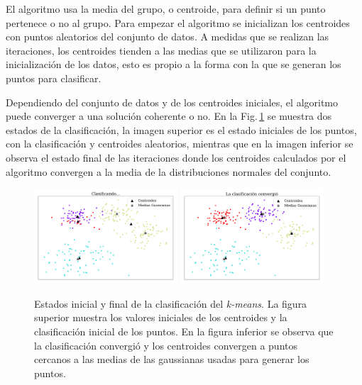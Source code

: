     El algoritmo usa la media del grupo, o centroide, para definir si un punto pertenece o no al grupo. Para empezar el algoritmo se inicializan los centroides con puntos aleatorios del conjunto de datos.  A medidas que se realizan las iteraciones, los centroides tienden a las medias que se utilizaron para la inicialización de los datos, esto es propio a la forma con la que se generan los puntos para clasificar.

    Dependiendo del conjunto de datos y de los centroides iniciales, el algoritmo puede converger a una solución coherente o no. En  la Fig.\,\ref{fig:ejer2_converge} se muestra dos estados de la clasificación, la imagen superior es el estado iniciales de los puntos, con la clasificación y centroides aleatorios, mientras que en la imagen inferior se observa el estado final de las iteraciones donde los centroides calculados por el algoritmo convergen a la media de la distribuciones normales del conjunto.

    \begin{figure}[H]
        \centering
        \includegraphics[width=0.475\textwidth]{plots/ejer_2_clasificando_a_conv.pdf}
        \includegraphics[width=0.475\textwidth]{plots/ejer_2_si_converge.pdf}
        \caption{Estados inicial y final de la clasificación  del \emph{k-means}. La figura superior muestra los valores iniciales de los centroides y la clasificación inicial de los puntos. En la figura inferior se observa que la clasificación convergió y los centroides convergen a puntos cercanos a las medias de las gaussianas  usadas para generar los puntos.}
        \label{fig:ejer2_converge}
    \end{figure}

